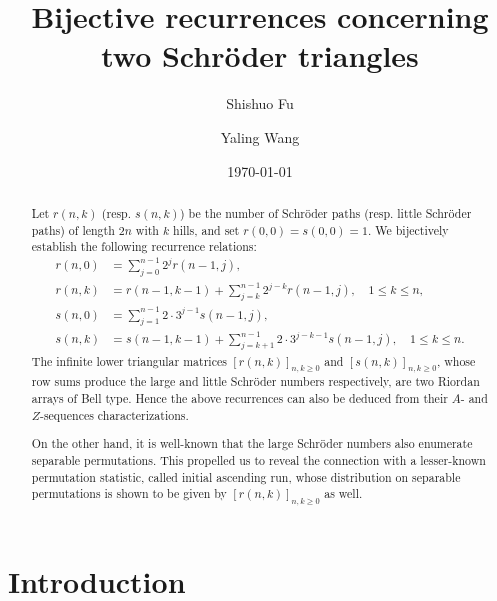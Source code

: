 \documentclass[11pt,reqno]{amsart}
\numberwithin{equation}{section}
\theoremstyle{plain}
\theoremstyle{definition}
\begin{document}
\title[Bijective Schr\"oder recurrences]{Bijective recurrences concerning two Schr\"oder triangles}

\author[S. Fu]{Shishuo Fu}
\address[Shishuo Fu]{College of Mathematics and Statistics, Chongqing University, Huxi campus, Chongqing 401331, P.R. China}


\author[Y. Wang]{Yaling Wang}

\address[Yaling Wang]{College of Mathematics and Statistics, Chongqing University, Huxi campus, Chongqing 401331, P.R. China}

\date{\today}


\begin{abstract}
Let $r(n,k)$ (resp. $s(n,k)$) be the number of Schr\"oder paths (resp. little Schr\"oder paths) of length $2n$ with $k$ hills, and set $r(0,0)=s(0,0)=1$. We bijectively establish the following recurrence relations:
\begin{align*}
r(n,0)&=\sum\limits_{j=0}^{n-1}2^{j}r(n-1,j),\\
r(n,k)&=r(n-1,k-1)+\sum\limits_{j=k}^{n-1}2^{j-k}r(n-1,j),\quad 1\le k\le n,\\
s(n,0) &=\sum\limits_{j=1}^{n-1}2\cdot3^{j-1}s(n-1,j),\\
s(n,k) &=s(n-1,k-1)+\sum\limits_{j=k+1}^{n-1}2\cdot3^{j-k-1}s(n-1,j),\quad 1\le k\le n.
\end{align*}
The infinite lower triangular matrices $[r(n,k)]_{n,k\ge 0}$ and $[s(n,k)]_{n,k\ge 0}$, whose row sums produce the large and little Schr\"oder numbers respectively, are two Riordan arrays of Bell type. Hence the above recurrences can also be deduced from their $A$- and $Z$-sequences characterizations.

On the other hand, it is well-known that the large Schr\"oder numbers also enumerate separable permutations. This propelled us to reveal the connection with a lesser-known permutation statistic, called initial ascending run, whose distribution on separable permutations is shown to be given by $[r(n,k)]_{n,k\ge 0}$ as well.
\end{abstract}

\subjclass[2010]{}

\keywords{}

\maketitle




\section{Introduction}\label{sec1: intro}
\end{document}
